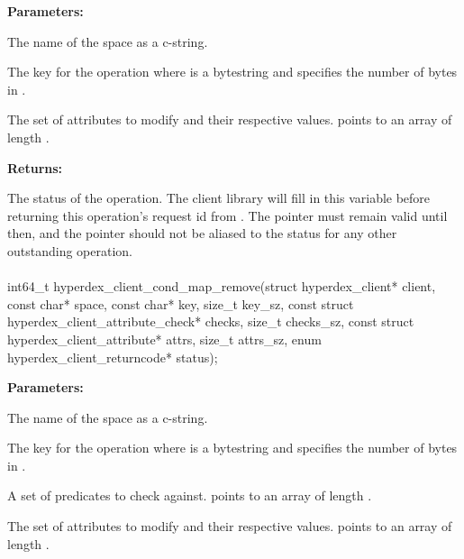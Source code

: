 \noindent\textbf{Parameters:}
\begin{description}[labelindent=\widthof{{\code{attrs}, \code{attrs\_sz}}},leftmargin=*,noitemsep,nolistsep,align=right]
\item[\code{space}] The name of the space as a c-string.
\item[\code{key}, \code{key\_sz}] The key for the operation where  is a bytestring and  specifies the number of bytes in .
\item[\code{attrs}, \code{attrs\_sz}] The set of attributes to modify and their respective values.   points to an array of length .
\end{description}

\noindent\textbf{Returns:}
\begin{description}[labelindent=\widthof{{\code{status}}},leftmargin=*,noitemsep,nolistsep,align=right]
\item[\code{status}] The status of the operation.  The client library will fill in this variable before returning this operation's request id from .  The pointer must remain valid until then, and the pointer should not be aliased to the status for any other outstanding operation.
\end{description}

\paragraph{}
\label{api:c:cond_map_remove}
\begin{ccode}
int64_t hyperdex_client_cond_map_remove(struct hyperdex_client* client,
                const char* space,
                const char* key, size_t key_sz,
                const struct hyperdex_client_attribute_check* checks, size_t checks_sz,
                const struct hyperdex_client_attribute* attrs, size_t attrs_sz,
                enum hyperdex_client_returncode* status);
\end{ccode}
\funcdesc 

\noindent\textbf{Parameters:}
\begin{description}[labelindent=\widthof{{\code{checks}, \code{checks\_sz}}},leftmargin=*,noitemsep,nolistsep,align=right]
\item[\code{space}] The name of the space as a c-string.
\item[\code{key}, \code{key\_sz}] The key for the operation where  is a bytestring and  specifies the number of bytes in .
\item[\code{checks}, \code{checks\_sz}] A set of predicates to check against.   points to an array of length .
\item[\code{attrs}, \code{attrs\_sz}] The set of attributes to modify and their respective values.   points to an array of length .
\end{description}

